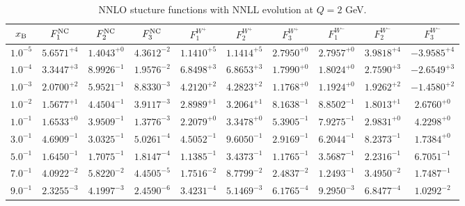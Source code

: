 \begin{table}[h]
\begin{adjustbox}{width=\textwidth}
\begin{tabular}{|c||c|c|c|c|c|c|c|c|c|}
\hline
$x_{\rm B}$ & $F_1^{\rm NC}$ & $F_2^{\rm NC}$ & $F_3^{\rm NC}$ & $F_1^{W^+}$ & $F_2^{W^+}$ & $F_3^{W^+}$ & $F_1^{W^-}$ & $F_2^{W^-}$ & $F_3^{W^-}$ \\
\hline
$ 1.0^{-5}$ & $ 5.6571^{+4}$ & $ 1.4043^{+0}$ & $ 4.3612^{-2}$ & $ 1.1410^{+5}$ & $ 1.1414^{+5}$ & $ 2.7950^{+0}$ & $ 2.7957^{+0}$ & $ 3.9818^{+4}$ & $-3.9585^{+4}$ \\
$ 1.0^{-4}$ & $ 3.3447^{+3}$ & $ 8.9926^{-1}$ & $ 1.9576^{-2}$ & $ 6.8498^{+3}$ & $ 6.8653^{+3}$ & $ 1.7990^{+0}$ & $ 1.8024^{+0}$ & $ 2.7590^{+3}$ & $-2.6549^{+3}$ \\
$ 1.0^{-3}$ & $ 2.0700^{+2}$ & $ 5.9521^{-1}$ & $ 8.8330^{-3}$ & $ 4.2120^{+2}$ & $ 4.2823^{+2}$ & $ 1.1768^{+0}$ & $ 1.1924^{+0}$ & $ 1.9262^{+2}$ & $-1.4580^{+2}$ \\
$ 1.0^{-2}$ & $ 1.5677^{+1}$ & $ 4.4504^{-1}$ & $ 3.9117^{-3}$ & $ 2.8989^{+1}$ & $ 3.2064^{+1}$ & $ 8.1638^{-1}$ & $ 8.8502^{-1}$ & $ 1.8013^{+1}$ & $ 2.6760^{+0}$ \\
$ 1.0^{-1}$ & $ 1.6533^{+0}$ & $ 3.9509^{-1}$ & $ 1.3776^{-3}$ & $ 2.2079^{+0}$ & $ 3.3478^{+0}$ & $ 5.3905^{-1}$ & $ 7.9275^{-1}$ & $ 2.9831^{+0}$ & $ 4.2298^{+0}$ \\
$ 3.0^{-1}$ & $ 4.6909^{-1}$ & $ 3.0325^{-1}$ & $ 5.0261^{-4}$ & $ 4.5052^{-1}$ & $ 9.6050^{-1}$ & $ 2.9169^{-1}$ & $ 6.2044^{-1}$ & $ 8.2373^{-1}$ & $ 1.7384^{+0}$ \\
$ 5.0^{-1}$ & $ 1.6450^{-1}$ & $ 1.7075^{-1}$ & $ 1.8147^{-4}$ & $ 1.1385^{-1}$ & $ 3.4373^{-1}$ & $ 1.1765^{-1}$ & $ 3.5687^{-1}$ & $ 2.2316^{-1}$ & $ 6.7051^{-1}$ \\
$ 7.0^{-1}$ & $ 4.0922^{-2}$ & $ 5.8220^{-2}$ & $ 4.4505^{-5}$ & $ 1.7516^{-2}$ & $ 8.7799^{-2}$ & $ 2.4837^{-2}$ & $ 1.2493^{-1}$ & $ 3.4950^{-2}$ & $ 1.7487^{-1}$ \\
$ 9.0^{-1}$ & $ 2.3255^{-3}$ & $ 4.1997^{-3}$ & $ 2.4590^{-6}$ & $ 3.4231^{-4}$ & $ 5.1469^{-3}$ & $ 6.1765^{-4}$ & $ 9.2950^{-3}$ & $ 6.8477^{-4}$ & $ 1.0292^{-2}$ \\
\hline
\end{tabular}
\end{adjustbox}\caption{NNLO stucture functions with NNLL evolution at $Q = 2$ GeV.}
\label{tab:N2LO-Q2}
\end{table}


